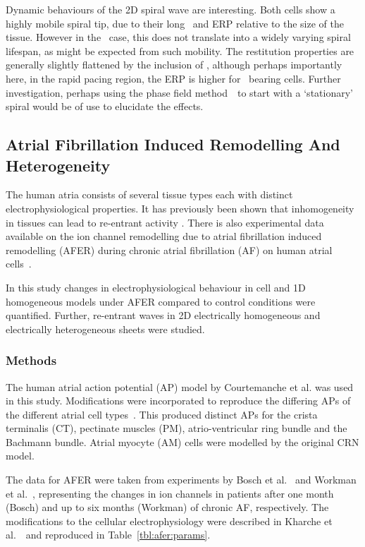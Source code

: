 Dynamic behaviours of the 2D spiral wave are interesting.
Both cells show a highly mobile spiral tip, due to their long \apd\ and ERP
relative to the size of the tissue.
However in the \ case, this does not translate into a widely varying
spiral lifespan, as might be expected from such mobility.
The restitution properties are generally slightly flattened by the inclusion of
, although perhaps importantly here, in the rapid pacing region, the
ERP is higher for \ bearing cells.
Further investigation, perhaps using the phase field
method~\cite{Biktashev1994}\ to start with a `stationary' spiral would be of use
to elucidate the effects.



\subsection{Atrial Fibrillation Induced Remodelling And Heterogeneity}

The human atria consists of several tissue types each with distinct
electrophysiological properties.  It has previously been shown that
inhomogeneity in tissues can lead to re-entrant activity
\cite{Bernus2005, Coronel1992, Kumagai1997}.  There is also experimental
data available on the ion channel remodelling due to atrial
fibrillation induced remodelling (AFER) during chronic atrial
fibrillation (AF) on human atrial cells~\cite{Bosch1999,Workman2001}.

In this study changes in electrophysiological
behaviour in cell and 1D homogeneous models under AFER compared to control
conditions were quantified.
Further, re-entrant waves in 2D electrically homogeneous
and electrically heterogeneous sheets were studied.

\subsubsection{Methods}

The human atrial action potential (AP) model by Courtemanche et
al.\cite{CRN98} was used in this study.  Modifications were
incorporated to reproduce the differing APs of the different atrial cell
types~\cite{Seemann2006}.  This produced distinct APs for the
crista terminalis (CT), pectinate muscles (PM), atrio-ventricular ring
bundle and the Bachmann bundle.  Atrial myocyte (AM) cells were modelled
by the original CRN model.

The data for AFER were taken from experiments by Bosch et
al.~\cite{Bosch1999} and Workman et al.~\cite{Workman2001}, representing
the changes in ion channels in patients after one month (Bosch)
and up to six months (Workman) of chronic AF, respectively.  The
modifications to the cellular electrophysiology were described in
Kharche et al.~\cite{Kharche2007}\ and reproduced in Table~\ref{tbl:afer:params}.


